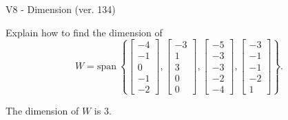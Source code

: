 \begin{exercise}
  \begin{exerciseTitle}V8 - Dimension (ver. 134)\end{exerciseTitle}
  \begin{exerciseStatement}
    Explain how to find the dimension of 
\[W=\mathrm{span}\ \left\{\left[\begin{array}{r}
-4 \\
-1 \\
0 \\
-1 \\
-2
\end{array}\right] , \left[\begin{array}{r}
-3 \\
1 \\
3 \\
0 \\
0
\end{array}\right] , \left[\begin{array}{r}
-5 \\
-3 \\
-3 \\
-2 \\
-4
\end{array}\right] , \left[\begin{array}{r}
-3 \\
-1 \\
-1 \\
-2 \\
1
\end{array}\right]\right\}.\]



  \end{exerciseStatement}
  \begin{exerciseAnswer}
   The dimension of \(W\) is  \(3\).
  


  \end{exerciseAnswer}
\end{exercise}